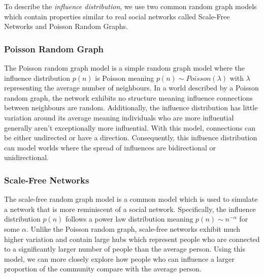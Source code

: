 \documentclass[10pt, oneside, reqno]{amsart}
\theoremstyle{plain}%
\theoremstyle{definition}
\theoremstyle{remark}
\begin{document}
To describe the \textit{influence distribution}, we use two common random graph models 
which contain properties similar to real social networks called Scale-Free Networks and 
Poisson Random Graphs.


\subsubsection{Poisson Random Graph}
The Poisson random graph model is a simple random graph model where the influence distribution $p(n)$ is Poisson meaning $p(n) \sim Poisson(\lambda)$ with $\lambda$ representing the average number of neighbours. In a world described by a Poisson random graph, the network exhibits no structure meaning influence connections between neighbours are random. 
Additionally, the influence distribution has little variation around its average meaning individuals who are more influential generally aren't exceptionally more influential.
With this model, connections can be either undirected or have a direction.
Consequently, this influence distribution can model worlds where the spread of influences are bidirectional or unidirectional.

\subsubsection{Scale-Free Networks}
The scale-free random graph model is a common model which is used to simulate a network that is more reminiscent of a social network. 
Specifically, the influence distribution $p(n)$ follows a power law distribution meaning $p(n) \sim n^{-\alpha}$ for some $\alpha$.
Unlike the Poisson random graph, scale-free networks exhibit much higher variation and contain large hubs which represent people who are connected to a significantly larger number of people than the average person. 
Using this model, we can more closely explore how people who can influence a larger proportion of the community compare with the average person.
\end{document}
